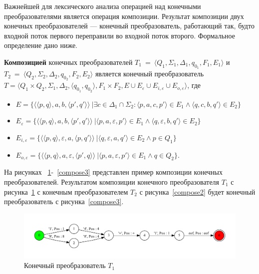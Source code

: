 \documentclass[14pt]{matmex-diploma}
\begin{document}
Важнейшей для лексического анализа операцией над конечными преобразователями является операция композиции. Результат композиции двух конечных преобразователей — конечный преобразователь, работающий так, будто входной поток первого переправили во входной поток второго. Формальное определение дано ниже.

\textbf{Композицией} конечных преобразователей 
$T_1~=~\langle Q_1, \Sigma_1, \Delta_1, q_{0_{1}}, F_1, E_1 \rangle$ и $T_2~=~\langle Q_2, \Sigma_2, \Delta_2, q_{0_{2}}, F_2, E_2 \rangle$ является конечный преобразователь  $T =\langle Q_1  \times Q_2, \Sigma_1, \Delta_2, \langle q_{0_{1}}, q_{0_{2}} \rangle, F_1 \times F_2, E \cup E_{\varepsilon} \cup E_{i,\varepsilon} \cup E_{o,\varepsilon} \rangle$, где 

\begin{itemize}
\item $E = \{ \langle \langle p, q \rangle, a, b, \langle p', q' \rangle \rangle\ | \exists c \in \Delta_1 \cap \Sigma_2 : \langle p, a, c, p' \rangle \in E_1 \wedge \langle q, c, b, q' \rangle \in E_2\}$
\item $E_{\varepsilon} = \{ \langle \langle p, q \rangle, a, b, \langle p', q' \rangle \rangle\ | \langle p, a, {\varepsilon}, p' \rangle \in E_1 \wedge \langle q, {\varepsilon}, b, q' \rangle \in E_2\}$
\item $E_{i, \varepsilon} = \{ \langle \langle p, q \rangle, {\varepsilon}, a, \langle p, q' \rangle \rangle\ | \langle q, {\varepsilon}, a, q' \rangle \in E_2 \wedge p \in Q_1 \} $
\item $E_{o, \varepsilon} = \{ \langle \langle p, q \rangle,  a, {\varepsilon}, \langle p', q \rangle \rangle\ | \langle p, a, {\varepsilon}, p' \rangle \in E_1 \wedge q \in Q_2 \}. $
\end{itemize}

На рисунках ~\ref{compose1}-~\ref{compose3} представлен пример композиции конечных преобразователей. Результатом композиции конечного преобразователя $T_1$ с рисунка~\ref{compose1} с конечным преобразователем $T_2$ с рисунка~\ref{compose2} будет конечный преобразователь с рисунка~\ref{compose3}.

\begin{figure}[h!]
        \includegraphics[width=\linewidth]{../pictures/example_.pdf}
        \caption{Конечный преобразователь $T_1$}
        \label{compose1} 
\end{figure}
\end{document}
